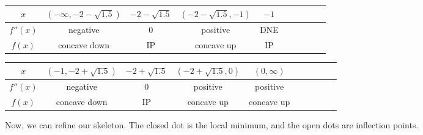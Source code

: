 \begin{solution}
\begin{itemize}
\begin{center}
\begin{tabular}{|c||c|c|c|c|c|c|c|c|c|}
\hline
$x$&$\left(-\infty,-2-\sqrt{1.5}\right)$&$-2-\sqrt{1.5}$&$(-2-\sqrt{1.5},-1)$&
$-1$
\\\hline
$f''(x)$&negative&0&positive&DNE\\
\hline
$f(x)$&concave down&IP&concave up&IP\\
\hline
\end{tabular}

\begin{tabular}{|c||c|c|c|c|c|c|c|c|c|}
\hline
$x$&$(-1,-2+\sqrt{1.5})$&$-2+\sqrt{1.5}$&$(-2+\sqrt{1.5},0)$
&$(0,\infty)$\\
\hline
$f''(x)$&negative&0&positive&positive\\
\hline
$f(x)$&concave down&IP&concave up&concave up\\
\hline
\end{tabular}\end{center}

Now, we can refine our skeleton. The closed dot is the local minimum, and the open dots are inflection points.
\begin{center}\end{center}
\end{itemize}
\end{solution}
\subsection*{\Application}



